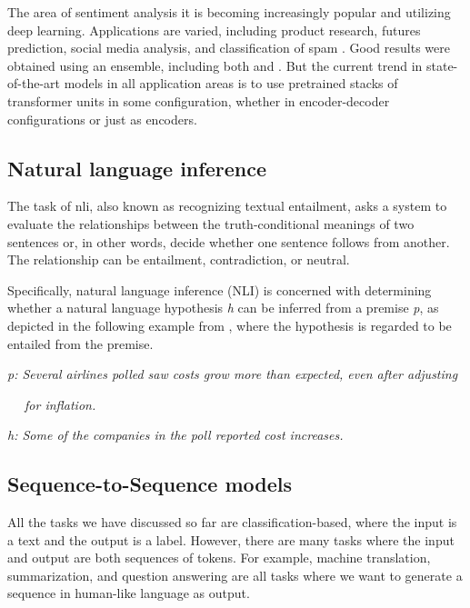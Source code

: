 The area of sentiment analysis it is becoming increasingly popular and utilizing deep learning. Applications are varied, including product research, futures prediction, social media analysis, and classification of spam \cite{ZhengWG18}. 
Good results were obtained using an ensemble, including both  and  \cite{Cliche17}.
But the current trend in state-of-the-art models in all application areas is to use pretrained stacks of transformer units in some configuration, whether in encoder-decoder configurations or just as encoders.


\subsection{Natural language inference}\label{subsec:nli}

The task of \acrfull{nli}, also
known as recognizing textual entailment,
asks a system to evaluate the relationships between
the truth-conditional meanings of two sentences
or, in other words, decide whether one sentence
follows from another.
The relationship can be entailment, contradiction, or neutral.

Specifically, natural language inference (NLI)
is concerned with determining whether a natural language hypothesis \emph{h} can be inferred from a
premise \emph{p}, as depicted in the following example
from \cite{Manning2009NaturalLI}, where the hypothesis is
regarded to be entailed from the premise.

\emph{p: Several airlines polled saw costs grow more than
expected, even after adjusting}
\par
\emph{$\quad$ for inflation.}
\par
\emph{h: Some of the companies in the poll reported cost
increases.}



\subsection[Seq2Seq]{Sequence-to-Sequence models}\label{subsec:seq2seq}

All the tasks we have discussed so far are classification-based, where the input is a text and the output is a label. However, there are many tasks where the input and output are both sequences of tokens. 
For example, machine translation, summarization, and question answering are all tasks where we want to generate a sequence in human-like language as output.

